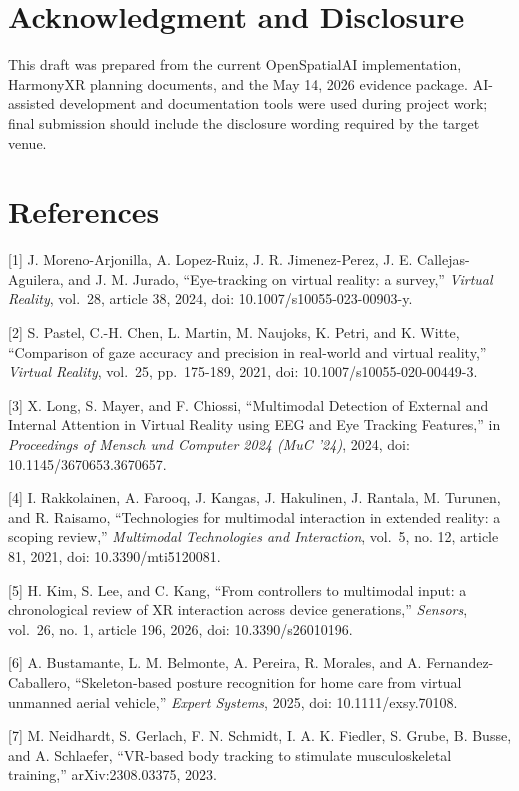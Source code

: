 \documentclass[
  10pt,
]{article}
\begin{document}
\section{Acknowledgment and
Disclosure}\label{acknowledgment-and-disclosure}

This draft was prepared from the current OpenSpatialAI implementation,
HarmonyXR planning documents, and the May 14, 2026 evidence package.
AI-assisted development and documentation tools were used during project
work; final submission should include the disclosure wording required by
the target venue.

\section{References}\label{references}

{[}1{]} J. Moreno-Arjonilla, A. Lopez-Ruiz, J. R. Jimenez-Perez, J. E.
Callejas-Aguilera, and J. M. Jurado, ``Eye-tracking on virtual reality:
a survey,'' \emph{Virtual Reality}, vol.~28, article 38, 2024, doi:
10.1007/s10055-023-00903-y.

{[}2{]} S. Pastel, C.-H. Chen, L. Martin, M. Naujoks, K. Petri, and K.
Witte, ``Comparison of gaze accuracy and precision in real-world and
virtual reality,'' \emph{Virtual Reality}, vol.~25, pp.~175-189, 2021,
doi: 10.1007/s10055-020-00449-3.

{[}3{]} X. Long, S. Mayer, and F. Chiossi, ``Multimodal Detection of
External and Internal Attention in Virtual Reality using EEG and Eye
Tracking Features,'' in \emph{Proceedings of Mensch und Computer 2024
(MuC '24)}, 2024, doi: 10.1145/3670653.3670657.

{[}4{]} I. Rakkolainen, A. Farooq, J. Kangas, J. Hakulinen, J. Rantala,
M. Turunen, and R. Raisamo, ``Technologies for multimodal interaction in
extended reality: a scoping review,'' \emph{Multimodal Technologies and
Interaction}, vol.~5, no. 12, article 81, 2021, doi: 10.3390/mti5120081.

{[}5{]} H. Kim, S. Lee, and C. Kang, ``From controllers to multimodal
input: a chronological review of XR interaction across device
generations,'' \emph{Sensors}, vol.~26, no. 1, article 196, 2026, doi:
10.3390/s26010196.

{[}6{]} A. Bustamante, L. M. Belmonte, A. Pereira, R. Morales, and A.
Fernandez-Caballero, ``Skeleton-based posture recognition for home care
from virtual unmanned aerial vehicle,'' \emph{Expert Systems}, 2025,
doi: 10.1111/exsy.70108.

{[}7{]} M. Neidhardt, S. Gerlach, F. N. Schmidt, I. A. K. Fiedler, S.
Grube, B. Busse, and A. Schlaefer, ``VR-based body tracking to stimulate
musculoskeletal training,'' arXiv:2308.03375, 2023.
\end{document}
